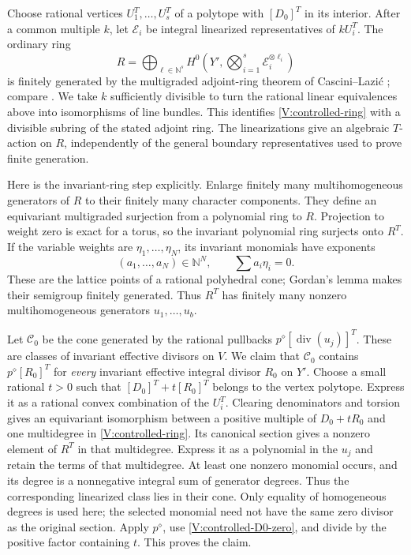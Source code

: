 Choose rational vertices $U_1^T,\ldots,U_s^T$ of a polytope with
$[D_0]^T$ in its interior.  After a common multiple $k$, let
$\mathcal E_i$ be integral linearized representatives of $kU_i^T$.
The ordinary ring
\begin{equation}\label{V:controlled-ring}
 R=\bigoplus_{\boldsymbol\ell\in\mathbb N^s}
 H^0\!\left(Y',\bigotimes_{i=1}^s
                      \mathcal E_i^{\otimes\ell_i}\right)
\end{equation}
is finitely generated by the multigraded adjoint-ring theorem of
Cascini--Lazi\'c \cite[Theorem~A]{CasciniLazic2012}; compare
\cite[Theorem~3.2(1)]{CortiLazic2013}.  We take $k$ sufficiently
divisible to turn the rational linear equivalences above into
isomorphisms of line bundles.  This identifies \eqref{V:controlled-ring}
with a divisible subring of the stated adjoint ring.  The linearizations
give an algebraic $T$-action on $R$, independently of the general
boundary representatives used to prove finite generation.

Here is the invariant-ring step explicitly.  Enlarge finitely many
multihomogeneous generators of $R$ to their finitely many character
components.  They define an equivariant multigraded surjection from a
polynomial ring to $R$.  Projection to weight zero is exact for a torus,
so the invariant polynomial ring surjects onto $R^T$.  If the variable
weights are $\eta_1,\ldots,\eta_N$, its invariant monomials have
exponents
\[
 (a_1,\ldots,a_N)\in\mathbb N^N,
 \qquad \sum a_i\eta_i=0.
\]
These are the lattice points of a rational polyhedral cone; Gordan's
lemma makes their semigroup finitely generated.  Thus $R^T$ has
finitely many nonzero multihomogeneous generators $u_1,\ldots,u_b$.

Let $\mathcal C_0$ be the cone generated by the rational pullbacks
$p^\diamond[\operatorname{div}(u_j)]^T$.  These are classes of
invariant effective divisors on $V$.  We claim that $\mathcal C_0$
contains $p^\diamond[R_0]^T$ for \emph{every} invariant effective
integral divisor $R_0$ on $Y'$.  Choose a small rational $t>0$ such
that $[D_0]^T+t[R_0]^T$ belongs to the vertex polytope.  Express it as
a rational convex combination of the $U_i^T$.  Clearing denominators
and torsion gives an equivariant isomorphism between a positive
multiple of $D_0+tR_0$ and one multidegree in
\eqref{V:controlled-ring}.  Its canonical section gives a nonzero
element of $R^T$ in that multidegree.  Express it as a polynomial in
the $u_j$ and retain the terms of that multidegree.  At least one
nonzero monomial occurs, and its degree is a nonnegative integral sum
of generator degrees.  Thus the corresponding linearized class lies
in their cone.  Only equality of homogeneous degrees is used here;
the selected monomial need not have the same zero divisor as the
original section.  Apply $p^\diamond$, use
\eqref{V:controlled-D0-zero}, and divide by the positive factor
containing $t$.  This proves the claim.

